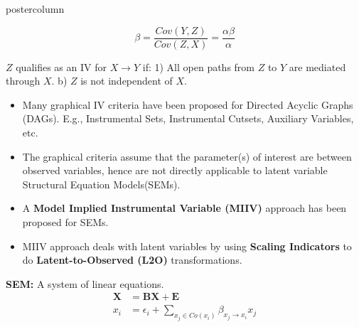 \documentclass{beamer}
\begin{document}
\begin{frame}
\begin{columns}
\begin{column}{.33\textwidth}
\begin{beamercolorbox}[center]{postercolumn}
\begin{minipage}{.98\textwidth}
{\begin{myblock}{}
				\begin{figure}
					\centering
					\begin{subfigure}{0.5\linewidth}
						\centering
						\caption*{}
					\end{subfigure}%
					\begin{subfigure}{0.5\linewidth}
						\centering
						$$ \beta = \frac{Cov(Y, Z)}{Cov(Z, X)} = \frac{\alpha \beta}{\alpha}$$
						\caption*{}
					\end{subfigure}
				\end{figure}
			\vspace{-0.9em}
			$ Z $ qualifies as an IV for $ X \to Y $ if: 1)
			All open paths from $ Z $ to $ Y $ are mediated through
			$ X $. b) $ Z $ is not independent of $ X $.
		\vspace{0.9em}

		\begin{itemize}
			\item \justifying Many graphical IV criteria have been
				proposed for Directed Acyclic Graphs (DAGs).
				E.g., Instrumental Sets, Instrumental Cutsets,
				Auxiliary Variables, etc.
			\item \justifying The graphical criteria assume that
				the parameter(s) of interest are between
				observed variables, hence are not directly
				applicable to latent variable Structural Equation Models(SEMs).
			\item \justifying A \textbf{Model Implied Instrumental
				Variable (MIIV)} approach has been proposed for
				SEMs.
			\item \justifying MIIV approach deals with latent
				variables by using \textbf{Scaling
				Indicators} to do \textbf{Latent-to-Observed (L2O)}
				transformations.
		\end{itemize}
	\end{myblock}\vfill
	\begin{myblock}{}
		\textbf{SEM:} A system of linear equations.
			\begin{equation*}
				\begin{split}
					\bm{X} &= \bm{BX} + \bm{E} \\
					x_i &= \epsilon_i + \sum_{x_j \in Co(x_i)} \beta_{x_j \to x_i} x_j 
				\end{split}
			\end{equation*}


\end{myblock}}
\end{minipage}
\end{beamercolorbox}
\end{column}
\end{columns}
\end{frame}
\end{document}
